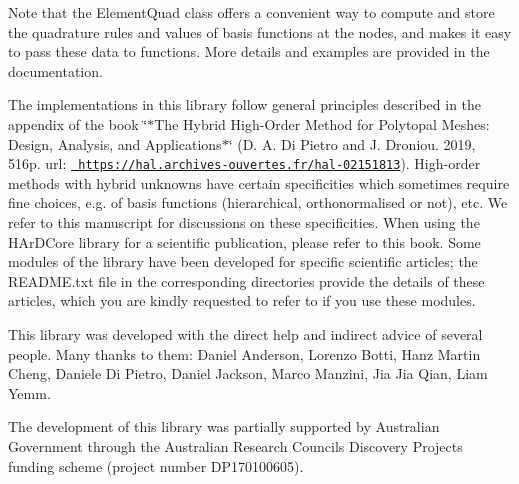 \begin{DoxyCode}{0}

\end{DoxyCode}


Note that the {\ttfamily Element\+Quad} class offers a convenient way to compute and store the quadrature rules and values of basis functions at the nodes, and makes it easy to pass these data to functions. More details and examples are provided in the documentation.

The implementations in this library follow general principles described in the appendix of the book \char`\"{}$\ast$\+The Hybrid High-\/\+Order Method for Polytopal Meshes\+: Design, Analysis, and Applications$\ast$\char`\"{} (D. A. Di Pietro and J. Droniou. 2019, 516p. url\+: \href{https://hal.archives-ouvertes.fr/hal-02151813}{\texttt{ https\+://hal.\+archives-\/ouvertes.\+fr/hal-\/02151813}}). High-\/order methods with hybrid unknowns have certain specificities which sometimes require fine choices, e.\+g. of basis functions (hierarchical, orthonormalised or not), etc. We refer to this manuscript for discussions on these specificities. When using the HAr\+DCore library for a scientific publication, please refer to this book. Some modules of the library have been developed for specific scientific articles; the README.\+txt file in the corresponding directories provide the details of these articles, which you are kindly requested to refer to if you use these modules.

This library was developed with the direct help and indirect advice of several people. Many thanks to them\+: Daniel Anderson, Lorenzo Botti, Hanz Martin Cheng, Daniele Di Pietro, Daniel Jackson, Marco Manzini, Jia Jia Qian, Liam Yemm.

The development of this library was partially supported by Australian Government through the Australian Research Council\textquotesingle{}s Discovery Projects funding scheme (project number DP170100605). 